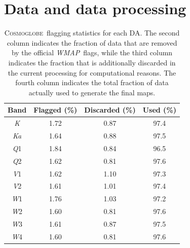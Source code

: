 \documentclass[twocolumn]{../../common/aa}
\def\WMAP{\emph{WMAP}}
\newcommand{\cosmoglobe}{\textsc{Cosmoglobe}}
\newcommand{\K}[0]{\textit K}
\newcommand{\Ka}[0]{\textit{Ka}}
\newcommand{\Q}[0]{\textit Q}
\newcommand{\V}[0]{\textit V}
\newcommand{\W}[0]{\textit W}
\begin{document}
\section{Data and data processing}
\label{sec:data}

\begin{table}
\caption{\cosmoglobe\ flagging statistics for each DA. The second column indicates the fraction of data that are removed by the official \WMAP\ flags, while the third column indicates the fraction that is additionally discarded in the current processing for computational reasons. The fourth column indicates the total fraction of data actually used to generate the final maps. }              %
\label{table:flagged_data}      %
\centering                                      %
\begin{tabular}{c c c c}          %
\hline\hline                        %
	Band & Flagged (\%) & Discarded (\%) & Used (\%) \\    %
\hline                                   %
	\K  &  1.72 & 0.87 & 97.4\\
	\Ka &  1.64 & 0.88 & 97.5\\      %
	\Q1 &  1.84 & 0.84 & 96.5\\
	\Q2 &  1.62 & 0.81 & 97.6\\
	\V1 &  1.62 & 1.10 & 97.3\\
	\V2 &  1.61 & 1.01 & 97.4\\
	\W1 &  1.76 & 1.03 & 97.2\\
	\W2 &  1.60 & 0.81 & 97.6\\
	\W3 &  1.61 & 0.87 & 97.5\\
	\W4 &  1.60 & 0.81 & 97.6\\
\hline                                             %
\end{tabular}
\end{table}
\end{document}
